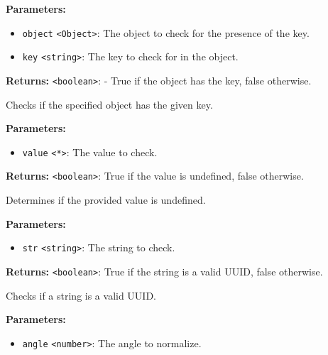 \documentclass[12pt,a4paper]{article}
\begin{document}
\noindent \textbf{Parameters:}
\begin{itemize}
  \item \texttt{object} \texttt{<Object>}: The object to check for the presence of the key.
  \item \texttt{key} \texttt{<string>}: The key to check for in the object.
\end{itemize}

\noindent \textbf{Returns:} \texttt{<boolean>}: - True if the object has the key, false otherwise.

\noindent Checks if the specified object has the given key.

\vspace{5mm}
\noindent {}


\noindent \textbf{Parameters:}
\begin{itemize}
  \item \texttt{value} \texttt{<*>}: The value to check.
\end{itemize}

\noindent \textbf{Returns:} \texttt{<boolean>}: True if the value is undefined, false otherwise.

\noindent Determines if the provided value is undefined.

\vspace{5mm}
\noindent {}


\noindent \textbf{Parameters:}
\begin{itemize}
  \item \texttt{str} \texttt{<string>}: The string to check.
\end{itemize}

\noindent \textbf{Returns:} \texttt{<boolean>}: True if the string is a valid UUID, false otherwise.

\noindent Checks if a string is a valid UUID.

\vspace{5mm}
\noindent {}


\noindent \textbf{Parameters:}
\begin{itemize}
  \item \texttt{angle} \texttt{<number>}: The angle to normalize.
\end{itemize}
\end{document}
